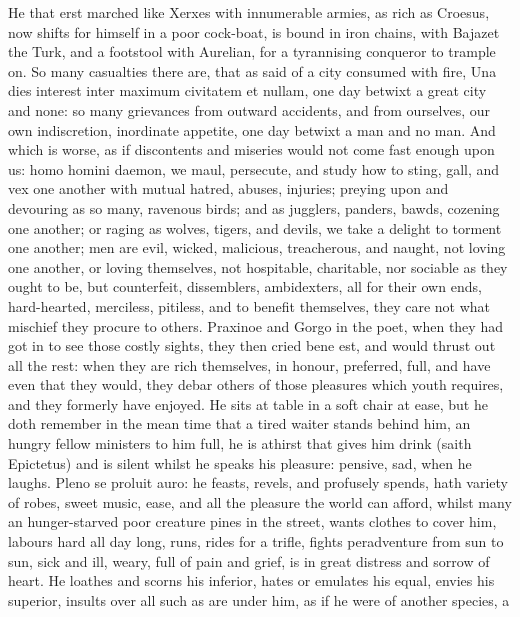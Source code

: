 {He that erst marched like Xerxes with innumerable armies, as rich as
Croesus, now shifts for himself in a poor cock-boat, is bound in iron
chains, with Bajazet the Turk, and a footstool with Aurelian, for a
tyrannising conqueror to trample on. So many casualties there are, that
as \Seneca said of a city consumed with fire, Una dies interest inter
maximum civitatem et nullam, one day betwixt a great city and none: so
many grievances from outward accidents, and from ourselves, our own
indiscretion, inordinate appetite, one day betwixt a man and no man.
And which is worse, as if discontents and miseries would not come fast
enough upon us: homo homini daemon, we maul, persecute, and study how
to sting, gall, and vex one another with mutual hatred, abuses,
injuries; preying upon and devouring as so many, ravenous birds;
and as jugglers, panders, bawds, cozening one another; or raging as
wolves, tigers, and devils, we take a delight to torment one
another; men are evil, wicked, malicious, treacherous, and
naught, not loving one another, or loving themselves, not
hospitable, charitable, nor sociable as they ought to be, but
counterfeit, dissemblers, ambidexters, all for their own ends,
hard-hearted, merciless, pitiless, and to benefit themselves, they care
not what mischief they procure to others. Praxinoe and Gorgo in
the poet, when they had got in to see those costly sights, they then
cried bene est, and would thrust out all the rest: when they are rich
themselves, in honour, preferred, full, and have even that they would,
they debar others of those pleasures which youth requires, and they
formerly have enjoyed. He sits at table in a soft chair at ease, but he
doth remember in the mean time that a tired waiter stands behind him,
an hungry fellow ministers to him full, he is athirst that gives him
drink (saith Epictetus) and is silent whilst he speaks his
pleasure: pensive, sad, when he laughs. Pleno se proluit auro: he
feasts, revels, and profusely spends, hath variety of robes, sweet
music, ease, and all the pleasure the world can afford, whilst many an
hunger-starved poor creature pines in the street, wants clothes to
cover him, labours hard all day long, runs, rides for a trifle, fights
peradventure from sun to sun, sick and ill, weary, full of pain and
grief, is in great distress and sorrow of heart. He loathes and scorns
his inferior, hates or emulates his equal, envies his superior, insults
over all such as are under him, as if he were of another species, a
}
